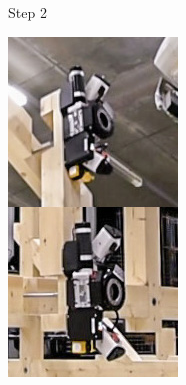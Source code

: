 \begin{figure}[!h]
\begin{subfigure}[b]{0.24\textwidth}
        \caption*{Step 2}%
    \end{subfigure}
    \hfill
    \begin{subfigure}[b]{0.24\textwidth}
        \centering
        \includegraphics[width=\textwidth]{images/7b/img88.jpg}

\end{subfigure}
\end{figure}
